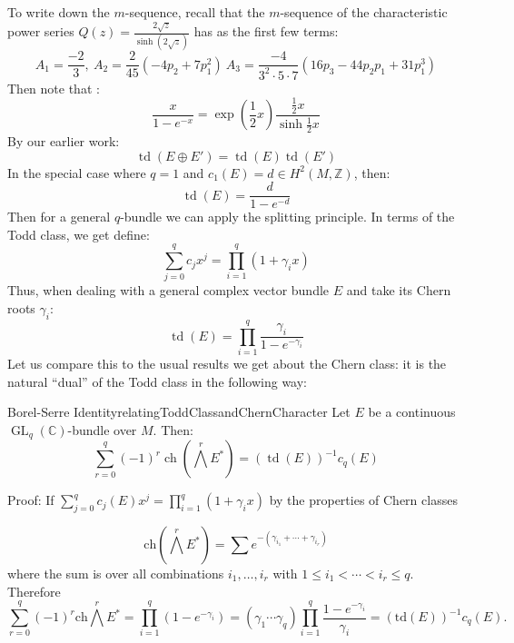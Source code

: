 \documentclass{ut-thesis}
\newenvironment{Proof}[1][]
  {\begin{ProofTcb}[#1]}
  {\end{ProofTcb}}
\newcommand{\Z}{{\mathbb{Z}}}
\newcommand{\C}{{\mathbb{C}}}
\newcommand{\ch}{{\operatorname{ch}}}
\newcommand{\GL}{{\operatorname{GL}}}
\newcommand{\td}{{\operatorname{td}}}
\renewcommand{\ch}{{\operatorname{ch}}}
\begin{document}
To write down the $m$-sequence, recall that the $m$-sequence of the
characteristic power series $Q(z) = \frac{2\sqrt{z}}{\sinh(2\sqrt{z})}$ has as the first few terms:
\[
  A_1 = \frac{-2}{3},\ A_2 = \frac{2}{45} (-4p_2 + 7p_1^2)\ A_3 = \frac{-4}{3^2\cdot 5\cdot 7} \left(16p_3
  - 44p_2p_1 + 31 p_1^3\right)
\]
Then note that :
\[
  \frac{x}{1-e^{-x}} = \exp \left(\frac{1}{2}x\right) \frac{\frac{1}{2}x}{\sinh \frac{1}{2}x}
\]
By our earlier work:
\[
  \td(E\oplus E') = \td(E)\td(E')
\]
In the special case where $q= 1$ and $c_1(E) = d \in H^2(M, \Z)$, then:
\[
  \td(E) = \frac{d}{1-e^{-d}}
\]
Then for a general $q$-bundle we can apply the splitting principle. In terms of the Todd class, we get
define:
\[
  \sum_{j=0}^q c_jx^j = \prod_{i=1}^q (1 + \gamma_ix)
\]
Thus, when dealing with a general complex vector bundle $E$ and take its Chern roots $\gamma_i$:
\[
  \td(E) = \prod_{i=1}^q \frac{\gamma_i}{1-e^{-\gamma_i}}
\]
Let us compare this to the usual results we get about the Chern class: it is the natural ``dual'' of the Todd
class in the following way:
\begin{thm}{Borel-Serre Identity}{relatingToddClassandChernCharacter}
  Let $E$ be a continuous $\GL_q(\C)$-bundle over $M$. Then:
  \[
    \sum_{r=0}^q (-1)^r \ch \left(\bigwedge^rE^*\right) = (\td(E))^{-1}c_q(E)
  \]
\end{thm}

\begin{Proof}
  Proof: If $\sum_{j=0}^q c_j(E) x^j = \prod_{i=1}^q (1 + \gamma_i x)$ by the properties of Chern classes

\[
    \text{ch}\left(\bigwedge^r E^*\right) = \sum e^{-(\gamma_{i_1} + \cdots + \gamma_{i_r})}
\]
where the sum is over all combinations $i_1, \ldots, i_r$ with $1 \leq i_1 < \cdots < i_r \leq q$. Therefore
\[
    \sum_{r=0}^q (-1)^r \text{ch}\bigwedge^r E^* = \prod_{i=1}^q (1-e^{-\gamma_i}) = (\gamma_1 \cdots \gamma_q) \prod_{i=1}^q \frac{1-e^{-\gamma_i}}{\gamma_i} = (\text{td}(E))^{-1} c_q(E).
\]
\end{Proof}

\end{document}
